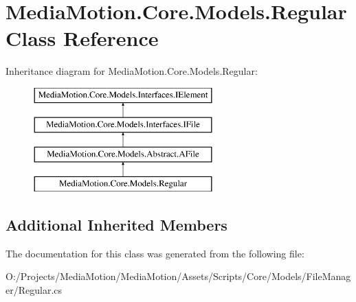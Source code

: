 \hypertarget{class_media_motion_1_1_core_1_1_models_1_1_regular}{\section{Media\+Motion.\+Core.\+Models.\+Regular Class Reference}
\label{class_media_motion_1_1_core_1_1_models_1_1_regular}
}
Inheritance diagram for Media\+Motion.\+Core.\+Models.\+Regular\+:\begin{figure}[H]
\begin{center}
\leavevmode
\includegraphics[height=4.000000cm]{class_media_motion_1_1_core_1_1_models_1_1_regular}
\end{center}
\end{figure}
\subsection*{Additional Inherited Members}


The documentation for this class was generated from the following file\+:\begin{DoxyCompactItemize}
\item 
O\+:/\+Projects/\+Media\+Motion/\+Media\+Motion/\+Assets/\+Scripts/\+Core/\+Models/\+File\+Manager/Regular.\+cs\end{DoxyCompactItemize}
